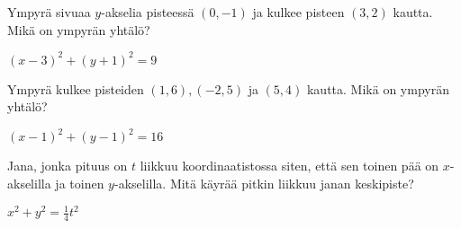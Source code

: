 \begin{tehtavasivu}
\begin{tehtava}
Ympyrä sivuaa $y$-akselia pisteessä $(0,-1)$ ja kulkee pisteen $(3,2)$ kautta. Mikä on ympyrän yhtälö?
\begin{vastaus}
$(x-3)^2+(y+1)^2=9$
\end{vastaus}
\end{tehtava}

\begin{tehtava}
Ympyrä kulkee pisteiden $(1,6), (-2,5)$ ja $(5,4)$ kautta. Mikä on ympyrän yhtälö?
\begin{vastaus}
$(x-1)^2+(y-1)^2=16$
\end{vastaus}
\end{tehtava}

\begin{tehtava}
Jana, jonka pituus on $t$ liikkuu koordinaatistossa siten, että sen toinen pää on $x$-akselilla ja toinen $y$-akselilla. Mitä käyrää pitkin liikkuu janan keskipiste?
\begin{vastaus}
$x^2+y^2=\frac{1}{4}t^2$
\end{vastaus}
\end{tehtava}

\end{tehtavasivu}